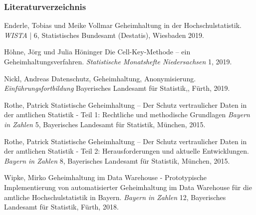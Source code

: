 \documentclass[aspectratio=169]{beamer}
\begin{document}

\begin{frame}
    \frametitle{Literaturverzeichnis}
    \scriptsize{
        \begin{thebibliography}{99} %

             Enderle, Tobias und Meike Vollmar
            \newblock Geheimhaltung in der Hochschulstatistik. \emph{WISTA} | 6, Statistisches Bundesamt (Destatis), Wiesbaden 2019.

             Höhne, Jörg und Julia Höninger
            \newblock Die Cell-Key-Methode – ein Geheimhaltungsverfahren. \emph{Statistische Monatshefte Niedersachsen} 1, 2019.

             Nickl, Andreas
            \newblock Datenschutz, Geheimhaltung, Anonymisierung. \emph{Einführungsfortbildung} Bayerisches Landesamt für Statistik,, Fürth, 2019.

             Rothe, Patrick
            \newblock Statistische Geheimhaltung – Der Schutz vertraulicher Daten in der amtlichen Statistik - Teil 1: Rechtliche und methodische Grundlagen \emph{Bayern in Zahlen} 5, Bayerisches Landesamt für Statistik, München, 2015.

             Rothe, Patrick
            \newblock Statistische Geheimhaltung – Der Schutz vertraulicher Daten in der amtlichen Statistik - Teil 2: Herausforderungen und aktuelle Entwicklungen. \emph{Bayern in Zahlen} 8, Bayerisches Landesamt für Statistik, München, 2015.

             Wipke, Mirko
            \newblock Geheimhaltung im Data Warehouse - Prototypische Implementierung von automatisierter Geheimhaltung im Data Warehouse für die amtliche Hochschulstatistik in Bayern. \emph{Bayern in Zahlen} 12, Bayerisches Landesamt für Statistik, Fürth, 2018.

        \end{thebibliography}
    }
\end{frame}
\end{document}
